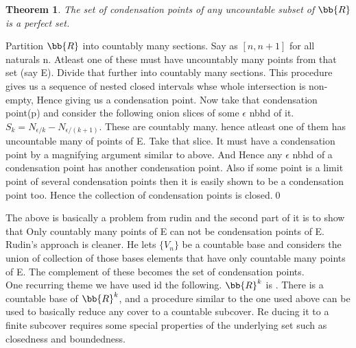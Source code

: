 \documentclass{myclass}
\newtheorem*{theorem}{Theorem}
\begin{document}
\begin{theorem}
    The set of condensation points of any uncountable subset of $\bb{R}$ is a perfect set.
\end{theorem}
\begin{prf}
    Partition $\bb{R}$ into countably many sections. Say as $[n,n+1]$ for all naturals n. Atleast one of these must have uncountably many points from that set (say E).
    Divide that further into countably many sections. This procedure gives us a sequence of nested closed intervals whse whole intersection is non-empty, Hence giving us a condensation point.
    Now take that condensation point(p) and consider the following onion slices of some $\epsilon$ nbhd of it. $S_k=N_{\epsilon/k}- N_{\epsilon/(k+1)}$. These are countably many. hence atleast one of them has uncountable many of points of E.
    Take that slice. It must have a condensation point by a magnifying argument similar to above. And Hence any $\epsilon$ nbhd of a condensation point has another condensation point. Also if some point is a limit point of several condensation points then it is easily shown to be a condensation point too.
    Hence the collection of condensation points is closed.\qed
\end{prf}

\begin{remark}
    The above is basically a problem from rudin and the second part of it is to show that 
    Only countably many points of E can not be condensation points of E. Rudin's approach is cleaner. He 
    lets $\{V_n\}$ be a countable base and considers the union of collection of those bases elements that have only countable many points of E.
    The complement of these becomes the set of condensation points.\\
    One recurring theme we have used id the following. $\bb{R}^k$ is . There is a countable base of $\bb{R}^k$,
    and a procedure similar to the one used above can be used to basically reduce any cover to a countable subcover. Re ducing it to a finite subcover requires some special properties of the underlying set such as closedness and boundedness.
\end{remark}
\end{document}
